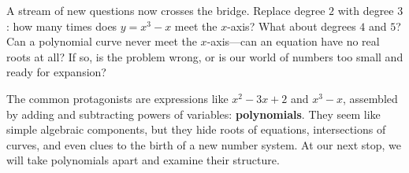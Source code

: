 A stream of new questions now crosses the bridge. Replace degree $2$ with degree $3$: how many times does $y=x^{3}-x$ meet the $x$-axis? What about degrees $4$ and $5$? Can a polynomial curve never meet the $x$-axis---can an equation have no real roots at all? If so, is the problem wrong, or is our world of numbers too small and ready for expansion?

The common protagonists are expressions like $x^{2}-3x+2$ and $x^{3}-x$, assembled by adding and subtracting powers of variables: \textbf{polynomials}. They seem like simple algebraic components, but they hide roots of equations, intersections of curves, and even clues to the birth of a new number system. At our next stop, we will take polynomials apart and examine their structure.

